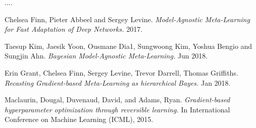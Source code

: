 \documentclass[a4paper]{article}
\begin{document}
....
\pagebreak
\begin{thebibliography}{9}
Chelsea Finn, Pieter Abbeel and Sergey Levine.
\textit{Model-Agnostic Meta-Learning for Fast Adaptation of Deep Networks.}
2017.

Taesup Kim, Jaesik Yoon, Ousmane Dia1, Sungwoong Kim, Yoshua Bengio and Sungjin Ahn.
\textit{Bayesian Model-Agnostic Meta-Learning.}
Jun 2018.

Erin Grant, Chelsea Finn, Sergey Levine, Trevor Darrell, Thomas Griffiths.
\textit{Recasting Gradient-based Meta-Learning as hierarchical Bayes.}
Jan 2018.

Maclaurin, Dougal, Duvenaud, David, and Adams, Ryan.
\textit{Gradient-based hyperparameter optimization through reversible learning.}
In International Conference on Machine Learning (ICML), 2015.
\end{thebibliography}
\end{document}
